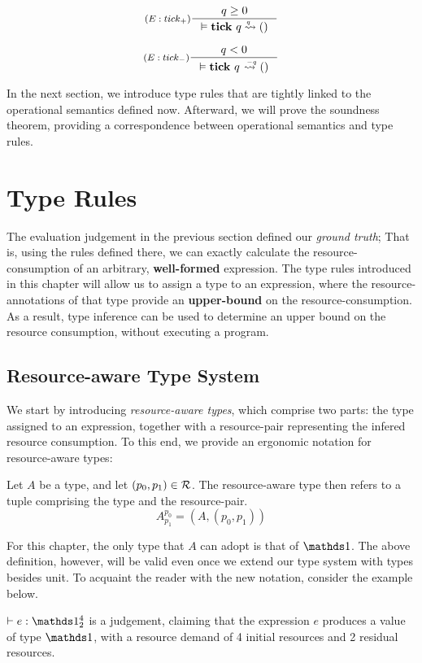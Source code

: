\[
   \inference[\((E:tick_{+})\)]
   {q \geq 0}
   {\evals{}{\tick{q}}{()}{q}{}}
\]

\[
   \inference[\((E:tick_{-})\)]
   {q < 0}
   {\evals{}{\tick{q}}{()}{}{-q}}
\]

In the next section, we introduce type rules that are tightly linked to the operational semantics defined now. Afterward, we will prove the soundness theorem, providing a correspondence between operational semantics and type rules. 

\section{Type Rules}
The evaluation judgement in the previous section defined our \emph{ground truth}; That is, using the rules defined there, we can exactly calculate the resource-consumption of an arbitrary, \textbf{well-formed} expression. The type rules introduced in this chapter will allow us to assign a type to an expression, where the resource-annotations of that type provide an \textbf{upper-bound} on the resource-consumption. As a result, type inference can be used to determine an upper bound on the resource consumption, without executing a program.

\subsection{Resource-aware Type System}

We start by introducing \emph{resource-aware types}, which comprise two parts: the type assigned to an expression, together with a resource-pair representing the infered resource consumption. To this end, we provide an ergonomic notation for resource-aware types:

\begin{definition}\label{def:ra-type}
   Let \(A\) be a type, and let \((p_0, p_1) \in \mathcal{R}\). The resource-aware type then refers to a tuple comprising the type and the resource-pair.
   \[A^{p_0}_{p_1} = (A, (p_0, p_1))\] 
\end{definition}

For this chapter, the only type that \(A\) can adopt is that of \(\unit\). The above definition, however, will be valid even once we extend our type system with types besides unit. To acquaint the reader with the new notation, consider the example below.

\begin{example}
   \(\typing{}{e}{\ratype{\unit}{4}{2}}\) is a judgement, claiming that the expression \(e\) produces a value of type \(\unit\), with a resource demand of 4 initial resources and 2 residual resources.
\end{example}

